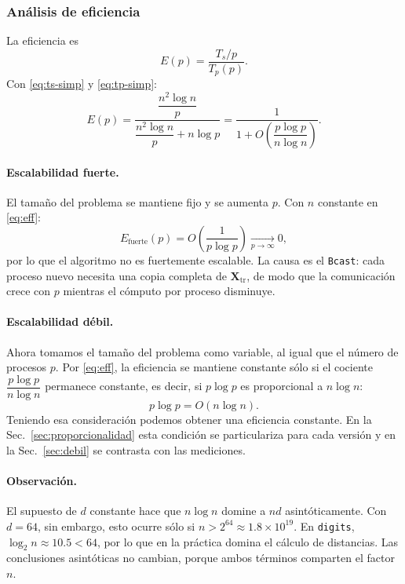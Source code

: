 \documentclass[11pt,a4paper]{article}
\newcommand{\ntr}{n}   %
\newcommand{\Xtr}{\mathbf{X}_{\text{tr}}}
\begin{document}
\subsubsection{Análisis de eficiencia}
La eficiencia es
\begin{equation*}
  E(p)=\frac{T_s/p}{T_p(p)}.
\end{equation*}
Con \eqref{eq:ts-simp} y \eqref{eq:tp-simp}:
\begin{equation}
  E(p)=\frac{\dfrac{\ntr^2\log\ntr}{p}}{\dfrac{\ntr^2\log\ntr}{p}+\ntr\log p}
  =\frac{1}{1+O\!\left(\dfrac{p\log p}{\ntr\log\ntr}\right)}.\label{eq:eff}
\end{equation}

\paragraph{Escalabilidad fuerte.}
El tamaño del problema se mantiene fijo y se aumenta $p$. Con $\ntr$ constante en \eqref{eq:eff}:
\begin{equation}
  E_{\text{fuerte}}(p)=O\!\left(\frac{1}{p\log p}\right)\xrightarrow[p\to\infty]{}0,\label{eq:efuerte}
\end{equation}
por lo que el algoritmo no es fuertemente escalable. La causa es el \texttt{Bcast}: cada proceso
nuevo necesita una copia completa de $\Xtr$, de modo que la comunicación crece con $p$ mientras el
cómputo por proceso disminuye.

\paragraph{Escalabilidad débil.}
Ahora tomamos el tamaño del problema como variable, al igual que el número de procesos $p$.
Por \eqref{eq:eff}, la eficiencia se mantiene constante sólo si el cociente
$\dfrac{p\log p}{\ntr\log\ntr}$ permanece constante, es decir, si $p\log p$ es proporcional a
$\ntr\log\ntr$:
\begin{equation}
  p\log p=O(\ntr\log\ntr).\label{eq:isoef}
\end{equation}
Teniendo esa consideración podemos obtener una eficiencia constante. En la
Sec.~\ref{sec:proporcionalidad} esta condición se particulariza para cada versión y en la
Sec.~\ref{sec:debil} se contrasta con las mediciones.

\paragraph{Observación.}
El supuesto de $d$ constante hace que $\ntr\log\ntr$ domine a $\ntr d$ asintóticamente. Con $d=64$,
sin embargo, esto ocurre sólo si $\ntr>2^{64}\approx1.8\times10^{19}$. En \texttt{digits},
$\log_2\ntr\approx10.5<64$, por lo que en la práctica domina el cálculo de distancias. Las
conclusiones asintóticas no cambian, porque ambos términos comparten el factor $\ntr$.
\end{document}
